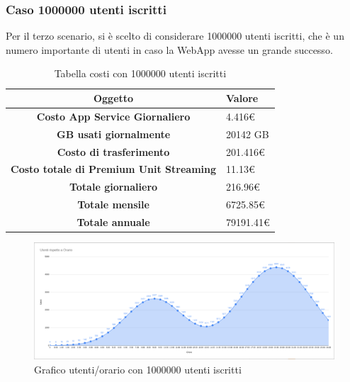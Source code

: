 \subsubsection{Caso 1000000 utenti iscritti}
Per il terzo scenario, si è scelto di considerare 1000000 utenti iscritti, che è un numero importante di utenti in caso la WebApp avesse un grande successo.\\
\begin{table}[H]
    \label{tab:costi-1000000}
    \begin{tabularx}{\textwidth}{|c|X|}
        \hline
        \textbf{Oggetto} & \textbf{Valore} \\\hline
        
        \textbf{Costo App Service Giornaliero} & {4.416€} \\ 
        \hline
        \textbf{GB usati giornalmente} & {20142 GB} \\ 
        \hline
        \textbf{Costo di trasferimento} & {201.416€}\\
        \hline
        \textbf{Costo totale di Premium Unit Streaming} & {11.13€}\\  
        \hline
        \textbf{Totale giornaliero} & {216.96€}\\  
        \hline
        \textbf{Totale mensile} & {6725.85€}\\  
        \hline
        \textbf{Totale annuale} & {79191.41€}\\  
        \hline
    \end{tabularx}
    \caption{Tabella costi con 1000000 utenti iscritti}
\end{table}
\begin{figure}[H]
    \centering
    \includegraphics[scale=0.25]{images/costi/1000kuser.png}
    \caption{Grafico utenti/orario con 1000000 utenti iscritti}
    \label{fig:costi-1000000}
\end{figure}